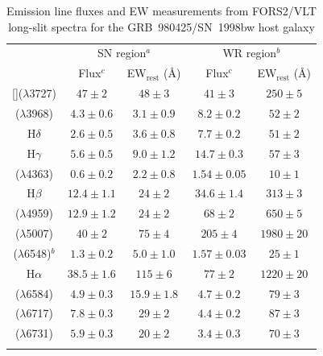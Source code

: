 \documentclass[traditabstract, referee]{aa}
\newcommand{\sii}{[\ion{S}{ii}]}
\newcommand{\oii}{[\ion{O}{ii}]}
\newcommand{\oiii}{[\ion{O}{iii}]}
\newcommand{\neiii}{[\ion{Ne}{iii}]}
\newcommand{\nii}{[\ion{N}{ii}]}
\begin{document}
\begin{appendix}
\begin{table}[!ht]
\caption{Emission line fluxes and EW measurements from FORS2/VLT long-slit spectra for the GRB~980425/SN~1998bw host galaxy \label{tab:fluxes}}
\centering
\begin{tabular}{ccccc}
\hline
\hline\noalign{\smallskip}
 &  \multicolumn{2}{c}{SN region$^{a}$} &  \multicolumn{2}{c}{WR region$^{b}$}  \\
 &  Flux$^{c}$ & EW$_{\mathrm{rest}}$ (\AA)  & Flux$^{c}$ & EW$_{\mathrm{rest}}$ (\AA) \\

\hline\noalign{\smallskip}

\oii($\lambda$3727)  & $47\pm2$ & $48\pm3$ & $41\pm3$ & $250\pm5$ \\
\neiii($\lambda$3968)& $4.3\pm0.6$ & $3.1\pm0.9$ & $8.2\pm0.2$ & $52\pm2$ \\
H$\delta$            & $2.6\pm0.5$ & $3.6\pm0.8$ & $7.7\pm0.2$ & $51\pm2$ \\
H$\gamma$            & $5.6\pm0.5$ & $9.0\pm1.2$ & $14.7\pm0.3$ & $57\pm3$ \\
\oiii($\lambda$4363) & $0.6\pm0.2$ & $2.2\pm0.8$ & $1.54\pm0.05$ & $10\pm1$ \\
H$\beta$             & $12.4\pm1.1$ & $24\pm2$ & $34.6\pm1.4$ & $313\pm3$ \\
\oiii($\lambda$4959) & $12.9\pm1.2$ & $24\pm2$ & $68\pm2$ & $650\pm5$ \\
\oiii($\lambda$5007) & $40\pm2$ & $75\pm4$ & $205\pm4$ & $1980\pm20$ \\
\hline
\hline
\nii($\lambda$6548)$^{b}$  & $1.3\pm0.2$ & $5.0\pm1.0$ & $1.57\pm0.03$ & $25\pm1$ \\
H$\alpha$            & $38.5\pm1.6$ & $115\pm6$ & $77\pm2$ & $1220\pm20$ \\
\nii($\lambda$6584)  & $4.9 \pm 0.3$ & $15.9\pm1.8$ & $4.7\pm0.2$ & $79\pm3$ \\
\sii($\lambda$6717)  & $7.8 \pm 0.3$ & $29\pm2$ & $4.4\pm0.2$ & $87\pm3$ \\
\sii($\lambda$6731)  & $5.9 \pm 0.3$ & $20\pm2$ & $3.4\pm0.3$ & $70\pm3$ \\
\hline\noalign{\smallskip}
\end{tabular}

\end{table}


\end{appendix}
\end{document}
